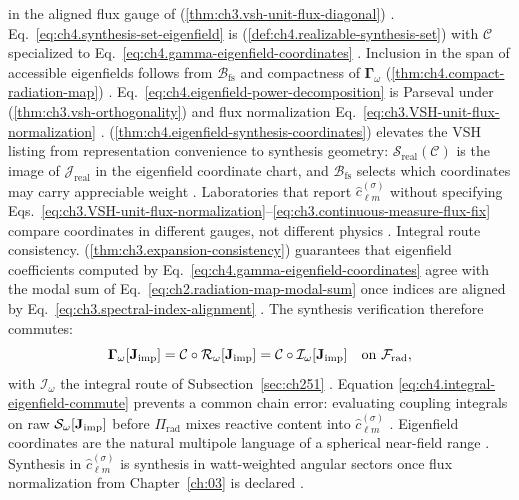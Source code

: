 in the aligned flux gauge of (\ref{thm:ch3.vsh-unit-flux-diagonal}) \cite{hansen1988}.
Eq.~\eqref{eq:ch4.synthesis-set-eigenfield} is (\ref{def:ch4.realizable-synthesis-set}) with
\(\mathcal{C}\) specialized to Eq.~\eqref{eq:ch4.gamma-eigenfield-coordinates} \cite{stratton1941}. Inclusion in the
span of accessible eigenfields follows from \(\mathcal{B}_{\mathrm{fs}}\) and compactness of
\(\boldsymbol{\Gamma}_\omega\) (\ref{thm:ch4.compact-radiation-map}) \cite{harrington2001}.
Eq.~\eqref{eq:ch4.eigenfield-power-decomposition} is Parseval under
(\ref{thm:ch3.vsh-orthogonality}) and flux normalization
Eq.~\eqref{eq:ch3.VSH-unit-flux-normalization} \cite{hansen1988}.
(\ref{thm:ch4.eigenfield-synthesis-coordinates}) elevates the VSH listing from representation convenience to
synthesis geometry: \(\mathcal{S}_{\mathrm{real}}(\mathcal{C})\) is the image of \(\mathcal{J}_{\mathrm{real}}\) in the
eigenfield coordinate chart, and \(\mathcal{B}_{\mathrm{fs}}\) selects which coordinates may carry appreciable weight
\cite{hansen1988}. Laboratories that report \(\widehat{c}_{\ell m}^{(\sigma)}\) without specifying
Eqs.~\eqref{eq:ch3.VSH-unit-flux-normalization}--\eqref{eq:ch3.continuous-measure-flux-fix} compare coordinates in
different gauges, not different physics \cite{harrington2001}.
Integral route consistency. (\ref{thm:ch3.expansion-consistency}) guarantees that eigenfield coefficients computed by
Eq.~\eqref{eq:ch4.gamma-eigenfield-coordinates} agree with the modal sum of
Eq.~\eqref{eq:ch2.radiation-map-modal-sum} once indices are aligned by
Eq.~\eqref{eq:ch3.spectral-index-alignment} \cite{stratton1941}. The synthesis verification therefore commutes:
\begin{equation}
\label{eq:ch4.integral-eigenfield-commute}
\boldsymbol{\Gamma}_\omega[\mathbf{J}_{\mathrm{imp}}]
=
\mathcal{C}\circ\mathcal{R}_\omega[\mathbf{J}_{\mathrm{imp}}]
=
\mathcal{C}\circ\mathcal{I}_\omega[\mathbf{J}_{\mathrm{imp}}]
\quad\text{on}\ \mathcal{F}_{\mathrm{rad}},
\end{equation}
with \(\mathcal{I}_\omega\) the integral route of Subsection~\ref{sec:ch251} \cite{harrington2001}. Equation
\eqref{eq:ch4.integral-eigenfield-commute} prevents a common chain error: evaluating coupling integrals on raw
\(\mathcal{S}_\omega[\mathbf{J}_{\mathrm{imp}}]\) before \(\Pi_{\mathrm{rad}}\) mixes reactive content into \(\widehat{c}_{\ell m}^{(\sigma)}\)
\cite{stratton1941}.
Eigenfield coordinates are the natural multipole language of a spherical near-field range \cite{hansen1988}. Synthesis in $\widehat{c}_{\ell m}^{(\sigma)}$ is synthesis in watt-weighted angular sectors once flux normalization from Chapter~\ref{ch:03} is declared \cite{harrington2001}.
